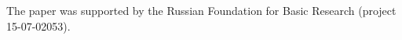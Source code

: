 




















\Ack


\noindent


The paper was supported by the Russian Foundation for Basic Research (project 15-07-02053).








\renewcommand{\bibname}{\protect\rmfamily References}







